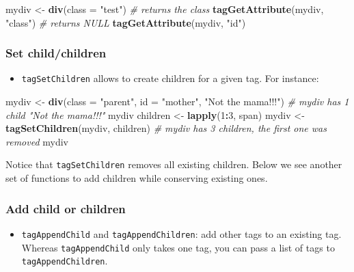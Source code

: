 \documentclass[]{book}
\newenvironment{Shaded}{\begin{snugshade}}{\end{snugshade}}
\newcommand{\CommentTok}[1]{\textcolor[rgb]{0.56,0.35,0.01}{\textit{#1}}}
\newcommand{\DataTypeTok}[1]{\textcolor[rgb]{0.13,0.29,0.53}{#1}}
\newcommand{\DecValTok}[1]{\textcolor[rgb]{0.00,0.00,0.81}{#1}}
\newcommand{\KeywordTok}[1]{\textcolor[rgb]{0.13,0.29,0.53}{\textbf{#1}}}
\newcommand{\NormalTok}[1]{#1}
\newcommand{\OperatorTok}[1]{\textcolor[rgb]{0.81,0.36,0.00}{\textbf{#1}}}
\newcommand{\StringTok}[1]{\textcolor[rgb]{0.31,0.60,0.02}{#1}}
\providecommand{\tightlist}{%
  \setlength{\itemsep}{0pt}\setlength{\parskip}{0pt}}
\begin{document}
\begin{Shaded}
\begin{Highlighting}[]
\NormalTok{mydiv <-}\StringTok{ }\KeywordTok{div}\NormalTok{(}\DataTypeTok{class =} \StringTok{"test"}\NormalTok{)}
\CommentTok{# returns the class}
\KeywordTok{tagGetAttribute}\NormalTok{(mydiv, }\StringTok{"class"}\NormalTok{)}
\CommentTok{# returns NULL}
\KeywordTok{tagGetAttribute}\NormalTok{(mydiv, }\StringTok{"id"}\NormalTok{)}
\end{Highlighting}
\end{Shaded}

\hypertarget{set-childchildren}{%
\subsubsection{Set child/children}\label{set-childchildren}}

\begin{itemize}
\tightlist
\item
  \texttt{tagSetChildren} allows to create children for a given tag. For instance:
\end{itemize}

\begin{Shaded}
\begin{Highlighting}[]
\NormalTok{mydiv <-}\StringTok{ }\KeywordTok{div}\NormalTok{(}\DataTypeTok{class =} \StringTok{"parent"}\NormalTok{, }\DataTypeTok{id =} \StringTok{"mother"}\NormalTok{, }\StringTok{"Not the mama!!!"}\NormalTok{)}
\CommentTok{# mydiv has 1 child "Not the mama!!!"}
\NormalTok{mydiv }
\NormalTok{children <-}\StringTok{ }\KeywordTok{lapply}\NormalTok{(}\DecValTok{1}\OperatorTok{:}\DecValTok{3}\NormalTok{, span)}
\NormalTok{mydiv <-}\StringTok{ }\KeywordTok{tagSetChildren}\NormalTok{(mydiv, children)}
\CommentTok{# mydiv has 3 children, the first one was removed}
\NormalTok{mydiv }
\end{Highlighting}
\end{Shaded}

Notice that \texttt{tagSetChildren} removes all existing children. Below we see another set of functions to add children while conserving existing ones.

\hypertarget{add-child-or-children}{%
\subsubsection{Add child or children}\label{add-child-or-children}}

\begin{itemize}
\tightlist
\item
  \texttt{tagAppendChild} and \texttt{tagAppendChildren}: add other tags to an existing tag.
  Whereas \texttt{tagAppendChild} only takes one tag, you can pass a list of tags to \texttt{tagAppendChildren}.
\end{itemize}
\end{document}
